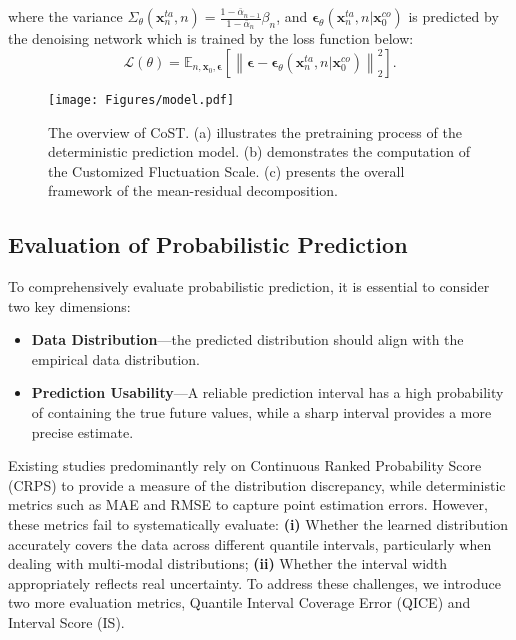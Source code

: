 where the variance $\Sigma_{\theta}(\mathbf{x}_n^{ta}, n)=\frac{1 - \bar{\alpha}_{n-1}}{1 - \bar{\alpha}_n} \beta_n$, and $\mathbf{\epsilon}_{\theta}(\mathbf{x}_n^{ta}, n| \mathbf{x}_0^{co})$ is predicted by the denoising network which is trained by the loss function below:
\begin{equation}
\label{eq:loss1}
   \mathcal{L}(\theta)  = \mathbb{E}_{n, \mathbf{x}_0, \mathbf{\epsilon}} \left[ \left\| \mathbf{\epsilon} - \mathbf{\epsilon}_{\theta}(\mathbf{x}_n^{ta}, n| \mathbf{x}_0^{co}) \right\|_2^2 \right].
\end{equation}


\begin{figure*}[t]
    \centering
    \texttt{[image: Figures/model.pdf]}
    \caption{The overview of CoST. (a) illustrates the pretraining process of the deterministic prediction model. (b) demonstrates the computation of the  Customized Fluctuation Scale. (c) presents the overall framework of the mean-residual decomposition.}
    \label{fig:model}
\end{figure*}


\subsection{Evaluation of Probabilistic Prediction}


To comprehensively evaluate probabilistic prediction, it is essential to consider two key dimensions: 
\begin{itemize}[leftmargin=*]
    \item \textbf{Data Distribution}—the predicted distribution should align with the empirical data distribution.
    \item \textbf{Prediction Usability}—A reliable prediction interval has a high probability of containing the true future values, while a sharp interval provides a more precise estimate. 
\end{itemize}

Existing studies predominantly rely on Continuous Ranked Probability Score (CRPS)  to provide a measure of the distribution discrepancy, while deterministic metrics such as MAE and RMSE to capture point estimation errors. However, these metrics fail to systematically evaluate: \textbf{(i)} Whether the learned distribution accurately covers the data across different quantile intervals, particularly when dealing with multi-modal distributions; \textbf{(ii)} Whether the interval width appropriately reflects real uncertainty. To address these challenges, we introduce two more evaluation metrics, Quantile Interval Coverage Error (QICE) and Interval Score (IS).



